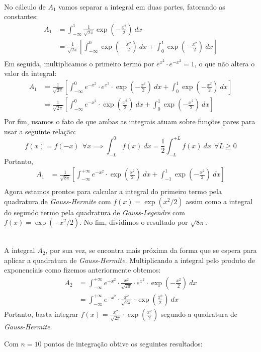 \documentclass{homework}
\begin{document}
	\subquest[$A_1$]\\
	No cálculo de $A_1$ vamos separar a integral em duas partes, fatorando as constantes:
	\begin{align*}
		A_1 &= \int_{-\infty}^{1} \frac{1}{\sqrt{2 \pi}} \exp \left(-\frac{x^2}{2}\right)~dx\\[1ex]
		&= \frac{1}{\sqrt{2 \pi}} \left[ \int_{-\infty}^{0} \exp \left(-\frac{x^2}{2}\right)~dx + \int_{0}^{1} \exp \left(-\frac{x^2}{2}\right)~dx \right] \\[1ex]
	\end{align*}
	Em seguida, multiplicamos o primeiro termo por $e^{x^2} \cdot e^{-x^2} = 1$, o que não altera o valor da integral:
	\begin{align*}
		A_1 &= \frac{1}{\sqrt{2 \pi}} \left[ \int_{-\infty}^{0} e^{-x^2} \cdot e^{x^2} \cdot \exp \left(-\frac{x^2}{2}\right)~dx + \int_{0}^{1} \exp \left(-\frac{x^2}{2}\right)~dx \right] \\[1ex]
		&= \frac{1}{\sqrt{2 \pi}} \left[ \int_{-\infty}^{0} e^{-x^2} \cdot \exp \left(\frac{x^2}{2}\right)~dx + \int_{0}^{1} \exp \left(-\frac{x^2}{2}\right)~dx \right] \\[1ex]
	\end{align*}
	Por fim, usamos o fato de que ambas as integrais atuam sobre funções pares para usar a seguinte relação:
	$$f(x) = f(-x)~~\forall x \implies \int_{-L}^{0} f(x)~dx = \frac{1}{2} \int_{-L}^{+L} f(x)~dx ~~\forall L \ge 0$$
	Portanto,
	\begin{align*}
		A_1 &= \frac{1}{\sqrt{8 \pi}} \left[ \int_{-\infty}^{+\infty} e^{-x^2} \cdot \exp \left(\frac{x^2}{2}\right)~dx + \int_{-1}^{1} \exp \left(-\frac{x^2}{2}\right)~dx \right] \\[1ex]
	\end{align*}
	Agora estamos prontos para calcular a integral do primeiro termo pela quadratura de \textit{Gauss-Hermite} com $f(x) = \exp \left(x^2 / 2\right)$ assim como a integral do segundo termo pela quadratura de \textit{Gauss-Legendre} com $f(x) = \exp \left(-x^2 / 2 \right)$. No fim, dividimos o resultado por $\sqrt{8 \pi}$.
	
	\subquest[$A_2$]\\
	A integral $A_2$, por sua vez, se encontra mais próxima da forma que se espera para aplicar a quadratura de \textit{Gauss-Hermite}. Multiplicando a integral pelo produto de exponenciais como fizemos anteriormente obtemos:
	\begin{align*}
		A_2 &= \int_{-\infty}^{+\infty} e^{-x^2} \cdot \frac{x^2}{\sqrt{2 \pi}} \cdot e^{x^2} \cdot \exp \left(-\frac{x^2}{2}\right)~dx \\[1ex]
		&= \int_{-\infty}^{+\infty} e^{-x^2} \cdot \frac{x^2}{\sqrt{2 \pi}} \cdot \exp \left(\frac{x^2}{2}\right)~dx
	\end{align*}
	Portanto, basta integrar $\displaystyle f(x) = \frac{x^2}{\sqrt{2 \pi}} \cdot \exp \left(\frac{x^2}{2}\right)$ segundo a quadratura de \textit{Gauss-Hermite}.\par
	Com $n = 10$ pontos de integração obtive os seguintes resultados:
	
\end{document}
